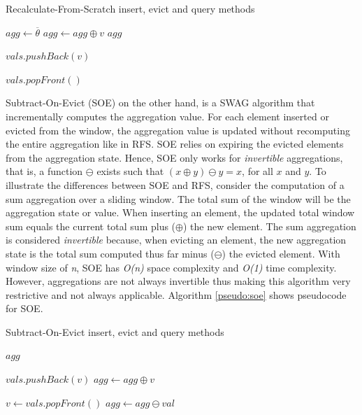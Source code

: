 \begin{algorithm}
    \caption{Recalculate-From-Scratch insert, evict and query methods}
    \label{pseudo:rfs}
    \begin{algorithmic}[1]
            \State $agg\gets\overline{\theta}$
                \State $agg \gets agg \oplus v$
            \EndFor
            \State \Return $agg$
        \EndFunction
        
        
        
            \State $vals.pushBack(v)$
        \EndFunction
        
        
        
            \State $vals.popFront()$
        \EndFunction
    \end{algorithmic}
\end{algorithm}

Subtract-On-Evict (SOE) on the other hand, is a SWAG algorithm that incrementally computes the aggregation value. For each element inserted or evicted from the window, the aggregation value is updated without recomputing the entire aggregation like in RFS. SOE relies on expiring the evicted elements from the aggregation state. Hence, SOE only works for \textit{invertible} aggregations, that is, a function $\ominus$ exists such that $(x \oplus y) \ominus y = x$, for all $x$ and $y$. To illustrate the differences between SOE and RFS, consider the computation of a sum aggregation over a sliding window. The total sum of the window will be the aggregation state or value. When inserting an element, the updated total window sum equals the current total sum plus ($\oplus$) the new element. The sum aggregation is considered \textit{invertible} because, when evicting an element, the new aggregation state is the total sum computed thus far minus ($\ominus$) the evicted element. With window size of \textit{n}, SOE has \textit{O(n)} space complexity and \textit{O(1)} time complexity. However, aggregations are not always invertible thus making this algorithm very restrictive and not always applicable. Algorithm \ref{pseudo:soe} shows pseudocode for SOE.

\begin{algorithm}
    \caption{Subtract-On-Evict insert, evict and query methods}
    \label{pseudo:soe}
    \begin{algorithmic}[1]
        
            \State \Return $agg$
        \EndFunction
        
        
        
            \State $vals.pushBack(v)$
            \State $agg \gets agg \oplus v$
        \EndFunction
        
        
        
            \State $v \gets vals.popFront()$
            \State $agg \gets agg \ominus val$
        \EndFunction
    \end{algorithmic}
\end{algorithm}

